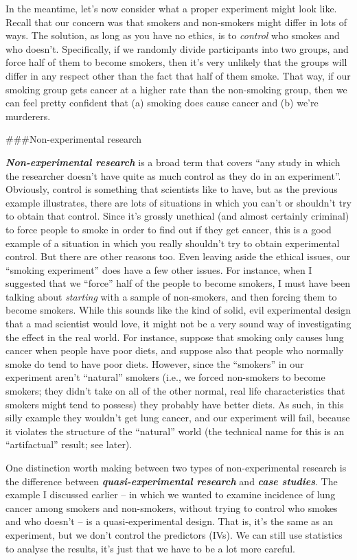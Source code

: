 \documentclass[]{book}
\begin{document}
In the meantime, let's now consider what a proper experiment might look like. Recall that our concern was that smokers and non-smokers might differ in lots of ways. The solution, as long as you have no ethics, is to \emph{control} who smokes and who doesn't. Specifically, if we randomly divide participants into two groups, and force half of them to become smokers, then it's very unlikely that the groups will differ in any respect other than the fact that half of them smoke. That way, if our smoking group gets cancer at a higher rate than the non-smoking group, then we can feel pretty confident that (a) smoking does cause cancer and (b) we're murderers.

\#\#\#Non-experimental research

\textbf{\emph{Non-experimental research}} is a broad term that covers ``any study in which the researcher doesn't have quite as much control as they do in an experiment''. Obviously, control is something that scientists like to have, but as the previous example illustrates, there are lots of situations in which you can't or shouldn't try to obtain that control. Since it's grossly unethical (and almost certainly criminal) to force people to smoke in order to find out if they get cancer, this is a good example of a situation in which you really shouldn't try to obtain experimental control. But there are other reasons too. Even leaving aside the ethical issues, our ``smoking experiment'' does have a few other issues. For instance, when I suggested that we ``force'' half of the people to become smokers, I must have been talking about \emph{starting} with a sample of non-smokers, and then forcing them to become smokers. While this sounds like the kind of solid, evil experimental design that a mad scientist would love, it might not be a very sound way of investigating the effect in the real world. For instance, suppose that smoking only causes lung cancer when people have poor diets, and suppose also that people who normally smoke do tend to have poor diets. However, since the ``smokers'' in our experiment aren't ``natural'' smokers (i.e., we forced non-smokers to become smokers; they didn't take on all of the other normal, real life characteristics that smokers might tend to possess) they probably have better diets. As such, in this silly example they wouldn't get lung cancer, and our experiment will fail, because it violates the structure of the ``natural'' world (the technical name for this is an ``artifactual'' result; see later).

One distinction worth making between two types of non-experimental research is the difference between \textbf{\emph{quasi-experimental research}} and \textbf{\emph{case studies}}. The example I discussed earlier -- in which we wanted to examine incidence of lung cancer among smokers and non-smokers, without trying to control who smokes and who doesn't -- is a quasi-experimental design. That is, it's the same as an experiment, but we don't control the predictors (IVs). We can still use statistics to analyse the results, it's just that we have to be a lot more careful.
\end{document}
